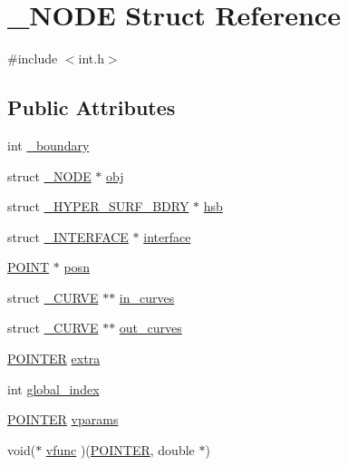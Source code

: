 \hypertarget{struct___n_o_d_e}{}\section{\+\_\+\+N\+O\+DE Struct Reference}
\label{struct___n_o_d_e}


{\ttfamily \#include $<$int.\+h$>$}

\subsection*{Public Attributes}
\begin{DoxyCompactItemize}
\item 
int \hyperlink{struct___n_o_d_e_a6d002773d5893f921fe7f8247fb103f4}{\+\_\+boundary}
\item 
struct \hyperlink{struct___n_o_d_e}{\+\_\+\+N\+O\+DE} $\ast$ \hyperlink{struct___n_o_d_e_a0d0fa75880d2721a9e8b8bf2f4508598}{obj}
\item 
struct \hyperlink{int_8h_d2/d15/struct___h_y_p_e_r___s_u_r_f___b_d_r_y}{\+\_\+\+H\+Y\+P\+E\+R\+\_\+\+S\+U\+R\+F\+\_\+\+B\+D\+RY} $\ast$ \hyperlink{struct___n_o_d_e_acfddd1c129d819893a6ff0511cbd3447}{hsb}
\item 
struct \hyperlink{int_8h_d0/d95/struct___i_n_t_e_r_f_a_c_e}{\+\_\+\+I\+N\+T\+E\+R\+F\+A\+CE} $\ast$ \hyperlink{struct___n_o_d_e_a3d4c9b1ef9cc466dcc5a80a4001a3432}{interface}
\item 
\hyperlink{int_8h_a3a87c5c9d0146e30a4bf720f701e5a63}{P\+O\+I\+NT} $\ast$ \hyperlink{struct___n_o_d_e_a5cffd03bc3c33495f3b7f3a1161a7887}{posn}
\item 
struct \hyperlink{struct___c_u_r_v_e}{\+\_\+\+C\+U\+R\+VE} $\ast$$\ast$ \hyperlink{struct___n_o_d_e_a14de6723c7e5ea4058563ce88dd7f810}{in\+\_\+curves}
\item 
struct \hyperlink{struct___c_u_r_v_e}{\+\_\+\+C\+U\+R\+VE} $\ast$$\ast$ \hyperlink{struct___n_o_d_e_a653f332f772cea48e4d98bc5c9d8866d}{out\+\_\+curves}
\item 
\hyperlink{cdecs_8h_ae51a81000f343b8ec43bca1f6a723d7b}{P\+O\+I\+N\+T\+ER} \hyperlink{struct___n_o_d_e_a2670bc532dcf95a67bd22f2d35a9446d}{extra}
\item 
int \hyperlink{struct___n_o_d_e_a261f43bc74ccafa8cb3e8a13569321ac}{global\+\_\+index}
\item 
\hyperlink{cdecs_8h_ae51a81000f343b8ec43bca1f6a723d7b}{P\+O\+I\+N\+T\+ER} \hyperlink{struct___n_o_d_e_aff7e5f27a978ad5b932267812ce9e247}{vparams}
\item 
void($\ast$ \hyperlink{struct___n_o_d_e_a9a4b0ffe9fdecc55e31dfea88e32c7cb}{vfunc} )(\hyperlink{cdecs_8h_ae51a81000f343b8ec43bca1f6a723d7b}{P\+O\+I\+N\+T\+ER}, double $\ast$)
\end{DoxyCompactItemize}


